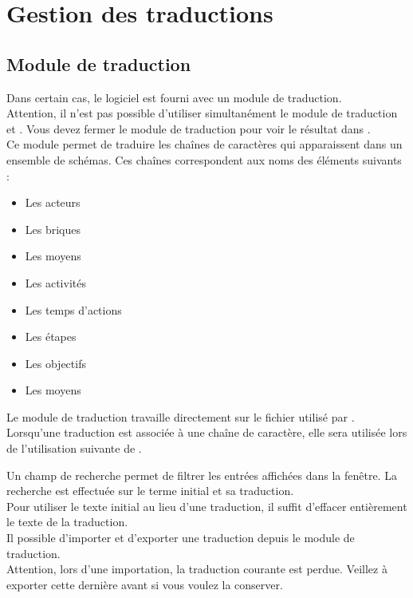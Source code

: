 \chapter{Gestion des traductions}
\section{Module de traduction}
\label{stringTranslator}
Dans certain cas, le logiciel \tria est fourni avec un module de traduction.\\

Attention, il n'est pas possible d'utiliser simultanément le module de traduction et \tria. Vous devez fermer le module de traduction pour voir le résultat dans \tria.\\

Ce module permet de traduire les chaînes de caractères qui apparaissent dans un ensemble de schémas. Ces chaînes correspondent aux noms des éléments suivants :\\

\begin{itemize}
\item Les acteurs
\item Les briques
\item Les moyens
\item Les activités
\item Les temps d'actions
\item Les étapes
\item Les objectifs
\item Les moyens\\
\end{itemize}

Le module de traduction travaille directement sur le fichier utilisé par \tria. Lorsqu'une traduction est associée à une chaîne de caractère, elle sera utilisée lors de l'utilisation suivante de \tria.

Un champ de recherche permet de filtrer les entrées affichées dans la fenêtre. La recherche est effectuée sur le terme initial et sa traduction.\\

Pour utiliser le texte initial au lieu d'une traduction, il suffit d'effacer entièrement le texte de la traduction.\\

Il possible d'importer et d'exporter une traduction depuis le module de traduction.\\

Attention, lors d'une importation, la traduction courante est perdue. Veillez à exporter cette dernière avant si vous voulez la conserver.\\

